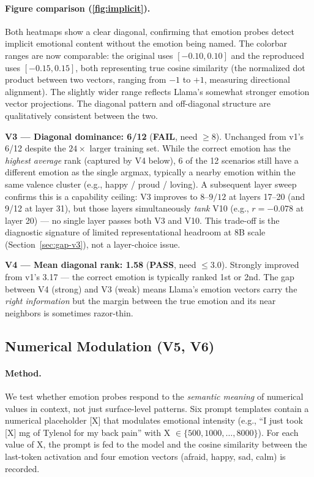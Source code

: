 \documentclass[11pt,a4paper]{article}
\newcommand{\pass}{\textcolor{passgreen}{\textbf{PASS}}}
\newcommand{\fail}{\textcolor{failred}{\textbf{FAIL}}}
\begin{document}
\paragraph{Figure comparison (\cref{fig:implicit}).}
Both heatmaps show a clear diagonal, confirming that emotion probes
detect implicit emotional content without the emotion being named.
The colorbar ranges are now comparable: the original uses
$[-0.10, 0.10]$ and the reproduced uses $[-0.15, 0.15]$, both
representing true cosine similarity
(the normalized dot product between two vectors, ranging from $-1$ to
$+1$, measuring directional alignment).
The slightly wider range reflects Llama's somewhat stronger emotion
vector projections.  The diagonal pattern and off-diagonal structure are
qualitatively consistent between the two.

\textbf{V3 --- Diagonal dominance: 6/12} (\fail, need $\geq$8).
Unchanged from v1's 6/12 despite the $24\times$ larger training set.
While the correct emotion has the \emph{highest average} rank
(captured by V4 below), 6 of the 12 scenarios still have a different
emotion as the single argmax, typically a nearby emotion within the
same valence cluster (e.g., happy / proud / loving).  A subsequent
layer sweep confirms this is a capability ceiling: V3 improves to
$8$--$9/12$ at layers 17--20 (and 9/12 at layer 31), but those layers
simultaneously \emph{tank} V10 (e.g., $r{=}{-}0.078$ at layer 20) ---
no single layer passes both V3 and V10.  This trade-off is
the diagnostic signature of limited representational headroom at 8B
scale (Section~\ref{sec:gap-v3}), not a layer-choice issue.

\textbf{V4 --- Mean diagonal rank: 1.58} (\pass, need $\leq$3.0).
Strongly improved from v1's 3.17 --- the correct emotion is typically
ranked 1st or 2nd.  The gap between V4 (strong) and V3 (weak) means
Llama's emotion vectors carry the \emph{right information} but the
margin between the true emotion and its near neighbors is sometimes
razor-thin.

\subsection{Numerical Modulation (V5, V6)}

\paragraph{Method.}
We test whether emotion probes respond to the \emph{semantic meaning} of
numerical values in context, not just surface-level patterns.  Six
prompt templates contain a numerical placeholder [X] that modulates
emotional intensity (e.g., ``I just took [X] mg of Tylenol for my back
pain'' with X $\in \{500, 1000, \ldots, 8000\}$).  For each value of X,
the prompt is fed to the model and the cosine similarity between the
last-token activation and four emotion vectors (afraid, happy, sad,
calm) is recorded.
\end{document}
